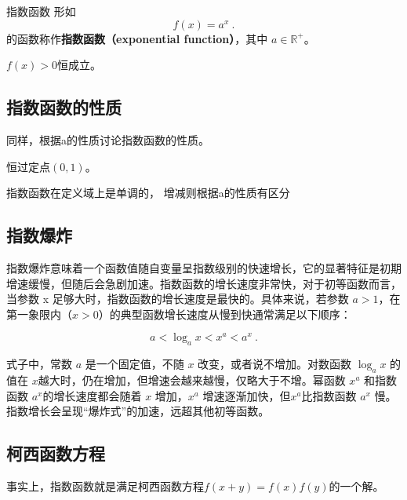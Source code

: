 \begin{definition}{指数函数}
形如
\begin{equation}
f(x) = a^x~.
\end{equation}
的函数称作\textbf{指数函数（exponential function）}，其中 $a\in\mathbb R^+$。
\end{definition}

$f(x)>0$恒成立。

\subsection{指数函数的性质}

同样，根据a的性质讨论指数函数的性质。

恒过定点$(0,1)$。

指数函数在定义域上是单调的，
增减则根据a的性质有区分


\subsection{指数爆炸}

指数爆炸意味着一个函数值随自变量呈指数级别的快速增长，它的显著特征是初期增速缓慢，但随后会急剧加速。指数函数的增长速度非常快，对于初等函数而言，当参数 x 足够大时，指数函数的增长速度是最快的。具体来说，若参数 $a > 1$，在第一象限内（$x > 0$）的典型函数增长速度从慢到快通常满足以下顺序：

\begin{equation}
 a < \log_a{x} <x^a < a^x~.
\end{equation}

式子中，常数 $a$ 是一个固定值，不随 $x$ 改变，或者说不增加。对数函数 $\log_a{x}$ 的值在 $x$越大时，仍在增加，但增速会越来越慢，仅略大于不增。幂函数 $x^a$ 和指数函数 $a^x$的增长速度都会随着 $x$ 增加，$x^a$ 增速逐渐加快，但$x^a$比指数函数 $a^x$ 慢。指数增长会呈现“爆炸式”的加速，远超其他初等函数。

\subsection{柯西函数方程}

事实上，指数函数就是满足柯西函数方程$f(x+y)=f(x)f(y)$的一个解。